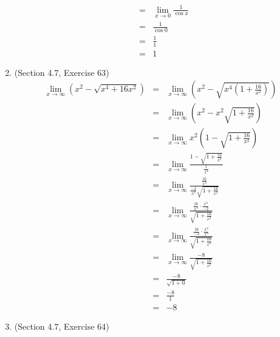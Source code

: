 \documentclass{article}
\begin{document}
\begin{enumerate}
\begin{eqnarray}
                                     &=& \lim_{x \to 0}{\frac{1}{\cos{x}}} \\
                                     &=& \frac{1}{\cos{0}} \\
                                     &=& \frac{1}{1} \\
                                     &=& 1
        \end{eqnarray}
    \item (Section 4.7, Exercise 63)
        \begin{eqnarray}
            \lim_{x \to \infty}{\left(x^2 - \sqrt{x^4 + 16x^2}\right)} &=& \lim_{x \to \infty}{\left(x^2 - \sqrt{x^4\left(1 + \frac{16}{x^2}\right)}\right)} \\
                                                                       &=& \lim_{x \to \infty}{\left(x^2 - x^2\sqrt{1 + \frac{16}{x^2}}\right)} \\
                                                                       &=& \lim_{x \to \infty}{x^2\left(1 - \sqrt{1 + \frac{16}{x^2}}\right)} \\
                                                                       &=& \lim_{x \to \infty}{\frac{1 - \sqrt{1 + \frac{16}{x^2}}}{\frac{1}{x^2}}} \\
                                                                       &=& \lim_{x \to \infty}{\frac{\frac{16}{x^3}}{\frac{-2}{x^3}\sqrt{1 + \frac{16}{x^2}}}} \\
                                                                       &=& \lim_{x \to \infty}{\frac{\frac{16}{x^3}\cdot\frac{x^3}{-2}}{\sqrt{1 + \frac{16}{x^2}}}} \\
                                                                       &=& \lim_{x \to \infty}{\frac{\frac{16}{-2}\cdot\frac{x^3}{x^3}}{\sqrt{1 + \frac{16}{x^2}}}} \\
                                                                       &=& \lim_{x \to \infty}{\frac{-8}{\sqrt{1 + \frac{16}{x^2}}}} \\
                                                                       &=& \frac{-8}{\sqrt{1 + 0}} \\
                                                                       &=& \frac{-8}{1} \\
                                                                       &=& -8
        \end{eqnarray}
    \item (Section 4.7, Exercise 64)

\end{enumerate}
\end{document}
